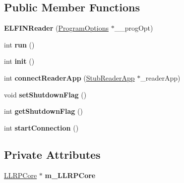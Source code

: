 \subsection*{Public Member Functions}
\begin{DoxyCompactItemize}
\item 
\hypertarget{class_e_l_f_i_n_1_1_e_l_f_i_n_reader_a6761951572d8ba5bef6c89f3c88b4c30}{{\bfseries E\-L\-F\-I\-N\-Reader} (\hyperlink{class_e_l_f_i_n_1_1_program_options}{Program\-Options} $\ast$\-\_\-\-\_\-prog\-Opt)}\label{class_e_l_f_i_n_1_1_e_l_f_i_n_reader_a6761951572d8ba5bef6c89f3c88b4c30}

\item 
\hypertarget{class_e_l_f_i_n_1_1_e_l_f_i_n_reader_ac4a16aee0b03a1859644bc9810d7cc5c}{int {\bfseries run} ()}\label{class_e_l_f_i_n_1_1_e_l_f_i_n_reader_ac4a16aee0b03a1859644bc9810d7cc5c}

\item 
\hypertarget{class_e_l_f_i_n_1_1_e_l_f_i_n_reader_ad6daa88daa3d64a27718dc6080bd8e38}{int {\bfseries init} ()}\label{class_e_l_f_i_n_1_1_e_l_f_i_n_reader_ad6daa88daa3d64a27718dc6080bd8e38}

\item 
\hypertarget{class_e_l_f_i_n_1_1_e_l_f_i_n_reader_afe07fe488fe3518f166b9dd825c7ae50}{int {\bfseries connect\-Reader\-App} (\hyperlink{class_e_l_f_i_n_1_1_stub_reader_app}{Stub\-Reader\-App} $\ast$\-\_\-reader\-App)}\label{class_e_l_f_i_n_1_1_e_l_f_i_n_reader_afe07fe488fe3518f166b9dd825c7ae50}

\item 
\hypertarget{class_e_l_f_i_n_1_1_e_l_f_i_n_reader_a8ad1b68f18ed7a9412ddd5b04e08bf8d}{void {\bfseries set\-Shutdown\-Flag} ()}\label{class_e_l_f_i_n_1_1_e_l_f_i_n_reader_a8ad1b68f18ed7a9412ddd5b04e08bf8d}

\item 
\hypertarget{class_e_l_f_i_n_1_1_e_l_f_i_n_reader_a7427c1f4bfc8374aa564de45feac9f9d}{int {\bfseries get\-Shutdown\-Flag} ()}\label{class_e_l_f_i_n_1_1_e_l_f_i_n_reader_a7427c1f4bfc8374aa564de45feac9f9d}

\item 
\hypertarget{class_e_l_f_i_n_1_1_e_l_f_i_n_reader_a878736b02c826041f149137069967cef}{int {\bfseries start\-Connection} ()}\label{class_e_l_f_i_n_1_1_e_l_f_i_n_reader_a878736b02c826041f149137069967cef}

\end{DoxyCompactItemize}
\subsection*{Private Attributes}
\begin{DoxyCompactItemize}
\item 
\hypertarget{class_e_l_f_i_n_1_1_e_l_f_i_n_reader_ad8dce6f480b4c750291057ae842e28d6}{\hyperlink{class_e_l_f_i_n_1_1_l_l_r_p_core}{L\-L\-R\-P\-Core} $\ast$ {\bfseries m\-\_\-\-L\-L\-R\-P\-Core}}\label{class_e_l_f_i_n_1_1_e_l_f_i_n_reader_ad8dce6f480b4c750291057ae842e28d6}

\end{DoxyCompactItemize}


